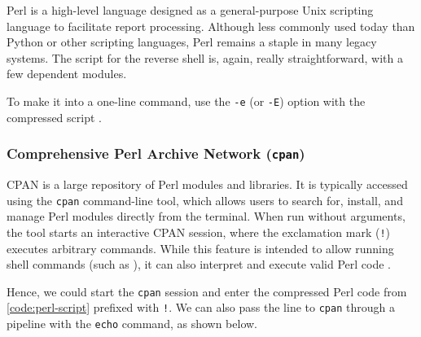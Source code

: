 
Perl is a high-level language designed as a general-purpose Unix scripting language to facilitate report processing. Although less commonly used today than Python or other scripting languages, Perl remains a staple in many legacy systems. The script for the reverse shell is, again, really straightforward, with a few dependent modules.



To make it into a one-line command, use the \texttt{-e} (or \texttt{-E}) option with the compressed script \cite{perl-man}.


\newpage


\subsubsection{Comprehensive Perl Archive Network (\texttt{cpan})}
\label{sec:cpan}


CPAN is a large repository of Perl modules and libraries. It is typically accessed using the \texttt{cpan} command-line tool, which allows users to search for, install, and manage Perl modules directly from the terminal. When run without arguments, the tool starts an interactive CPAN session, where the exclamation mark (\texttt{!}) executes arbitrary commands. While this feature is intended to allow running shell commands (such as ), it can also interpret and execute valid Perl code \cite{cpan-man}.

Hence, we could start the \texttt{cpan} session and enter the compressed Perl code from \cref{code:perl-script} prefixed with \texttt{!}. We can also pass the line to \texttt{cpan} through a pipeline with the \texttt{echo} command, as shown below.



